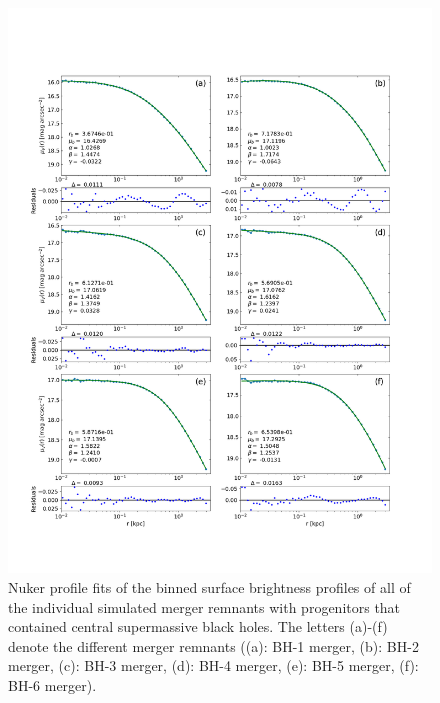 \documentclass[english, twoside]{HYgradu}
\begin{document}
\begin{figure}
	\centering
	\includegraphics[width=\textwidth]{all_nuker_profiles.png}
	\caption{Nuker profile fits of the binned surface brightness profiles of all of the individual simulated merger remnants with progenitors that contained central supermassive black holes. The letters (a)-(f) denote the different merger remnants ((a): BH-1 merger, (b): BH-2 merger, (c): BH-3 merger, (d): BH-4 merger, (e): BH-5 merger, (f): BH-6 merger).}
	\label{figure:all_nuker}
\end{figure}
\end{document}
